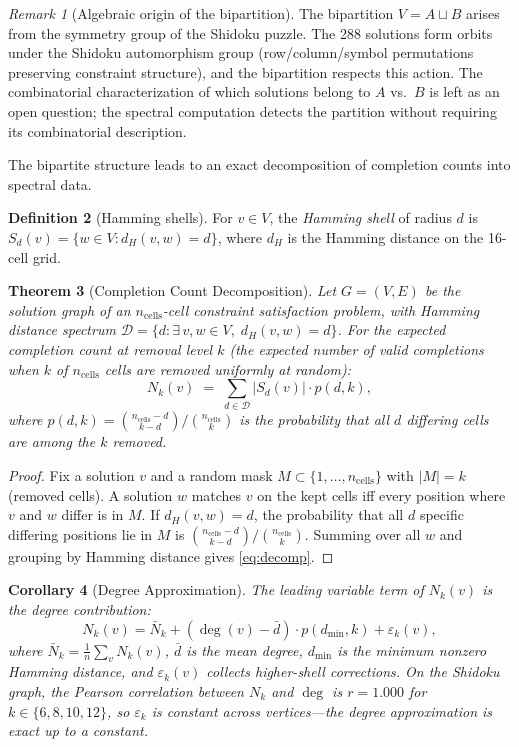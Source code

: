 \documentclass[11pt]{article}
\newtheorem{theorem}{Theorem}[section]
\newtheorem{corollary}[theorem]{Corollary}
\theoremstyle{definition}
\newtheorem{definition}[theorem]{Definition}
\theoremstyle{remark}
\newtheorem{remark}[theorem]{Remark}
\newcommand{\ncells}{n_{\mathrm{cells}}}
\begin{document}
\begin{remark}[Algebraic origin of the bipartition]
The bipartition $V = A \sqcup B$ arises from the symmetry group of the Shidoku puzzle. The 288 solutions form orbits under the Shidoku automorphism group (row/column/symbol permutations preserving constraint structure), and the bipartition respects this action. The combinatorial characterization of which solutions belong to $A$ vs.\ $B$ is left as an open question; the spectral computation detects the partition without requiring its combinatorial description.
\end{remark}

The bipartite structure leads to an exact decomposition of completion counts into spectral data.

\begin{definition}[Hamming shells]
For $v \in V$, the \emph{Hamming shell} of radius $d$ is $S_d(v) = \{w \in V : d_H(v, w) = d\}$, where $d_H$ is the Hamming distance on the 16-cell grid.
\end{definition}

\begin{theorem}[Completion Count Decomposition]\label{thm:decomp}
Let $G = (V, E)$ be the solution graph of an $\ncells$-cell constraint satisfaction problem, with Hamming distance spectrum $\mathcal{D} = \{d : \exists\, v, w \in V,\; d_H(v, w) = d\}$. For the \emph{expected completion count} at removal level $k$ (the expected number of valid completions when $k$ of $\ncells$ cells are removed uniformly at random):
\begin{equation}\label{eq:decomp}
N_k(v) \;=\; \sum_{d \in \mathcal{D}} |S_d(v)| \cdot p(d, k),
\end{equation}
where $p(d, k) = \binom{\ncells - d}{k - d}\Big/\binom{\ncells}{k}$ is the probability that all $d$ differing cells are among the $k$ removed.
\end{theorem}

\begin{proof}
Fix a solution $v$ and a random mask $M \subset \{1, \ldots, \ncells\}$ with $|M| = k$ (removed cells). A solution $w$ matches $v$ on the kept cells iff every position where $v$ and $w$ differ is in $M$. If $d_H(v, w) = d$, the probability that all $d$ specific differing positions lie in $M$ is $\binom{\ncells - d}{k - d}/\binom{\ncells}{k}$. Summing over all $w$ and grouping by Hamming distance gives \eqref{eq:decomp}.
\end{proof}

\begin{corollary}[Degree Approximation]\label{cor:degree_approx}
The leading variable term of $N_k(v)$ is the degree contribution:
\[
N_k(v) = \bar{N}_k + (\deg(v) - \bar{d})\cdot p(d_{\min}, k) + \varepsilon_k(v),
\]
where $\bar{N}_k = \tfrac{1}{n}\sum_v N_k(v)$, $\bar{d}$ is the mean degree, $d_{\min}$ is the minimum nonzero Hamming distance, and $\varepsilon_k(v)$ collects higher-shell corrections. On the Shidoku graph, the Pearson correlation between $N_k$ and $\deg$ is $r = 1.000$ for $k \in \{6, 8, 10, 12\}$, so $\varepsilon_k$ is constant across vertices---the degree approximation is \emph{exact} up to a constant.
\end{corollary}
\end{document}
